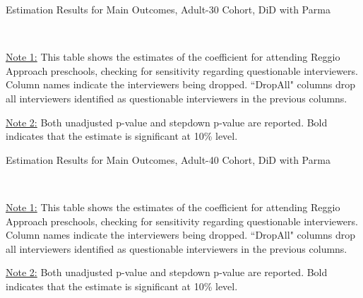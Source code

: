 \begin{table}[H] \caption{Estimation Results for Main Outcomes, Adult-30 Cohort, DiD with Parma} \label{didpm-M-adult30-sensitivity}
\scalebox{0.7}{}
\vspace{1ex} \\
\footnotesize\raggedright{\underline{Note 1:} This table shows the estimates of the coefficient for attending Reggio Approach preschools, checking for sensitivity regarding questionable interviewers. Column names indicate the interviewers being dropped. ``DropAll" columns drop all interviewers identified as questionable interviewers in the previous columns.}

\footnotesize\raggedright{\underline{Note 2:} Both unadjusted p-value and stepdown p-value are reported. Bold indicates that the estimate is significant at 10\% level.}
\end{table}


\begin{table}[H] \caption{Estimation Results for Main Outcomes, Adult-40 Cohort, DiD with Parma} \label{didpm-M-adult40-sensitivity}
\scalebox{0.7}{}
\vspace{1ex} \\
\footnotesize\raggedright{\underline{Note 1:} This table shows the estimates of the coefficient for attending Reggio Approach preschools, checking for sensitivity regarding questionable interviewers. Column names indicate the interviewers being dropped. ``DropAll" columns drop all interviewers identified as questionable interviewers in the previous columns.}

\footnotesize\raggedright{\underline{Note 2:} Both unadjusted p-value and stepdown p-value are reported. Bold indicates that the estimate is significant at 10\% level.}
\end{table}




